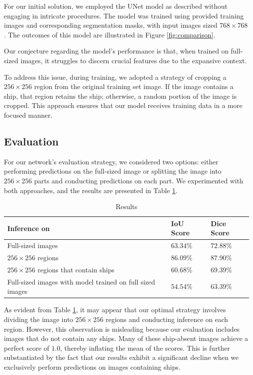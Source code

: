 \documentclass{article}
\begin{document}
For our initial solution, we employed the UNet model as described without engaging in intricate procedures.
The model was trained using provided training images and corresponding segmentation masks, with input
images sized \(768 \times 768\). The outcomes of this model are illustrated in Figure \ref{fig:comparison}.

Our conjecture regarding the model's performance is that, when trained on full-sized images, it struggles
to discern crucial features due to the expansive context.

To address this issue, during training, we adopted a strategy of cropping a \(256 \times 256\) region from
the original training set image. If the image contains a ship, that region retains the ship; otherwise, a random
portion of the image is cropped. This approach ensures that our model receives training data in a more focused manner.


\subsection{Evaluation}

For our network's evaluation strategy, we considered two options: either performing predictions on the full-sized image
or splitting the image into \(256 \times 256\) parts and conducting predictions on each part. We experimented with both
approaches, and the results are presented in Table \ref{results-table}.

\begin{table}
  \caption{Results}
  \label{results-table}
  \centering
  \begin{tabular}{lll}
    \toprule
    Inference on             & IoU Score & Dice Score \\[0.1cm]
    \midrule
    Full-sized images        & $63.34\%$ & $72.88\%$  \\[0.1cm]
    $256 \times 256$ regions & $86.09\%$ & $87.90\%$  \\[0.1cm]
    $256 \times 256$ regions 
      that contain ships     & $60.68\%$ & $69.39\%$  \\[0.1cm]
    Full-sized images with 
      model trained on full 
      sized images           & $54.54\%$ & $63.39\%$  \\[0.1cm]
    \bottomrule
  \end{tabular}
\end{table}

As evident from Table \ref{results-table}, it may appear that our optimal strategy involves dividing the image into
\(256 \times 256\) regions and conducting inference on each region. However, this observation is misleading because
our evaluation includes images that do not contain any ships. Many of these ship-absent images achieve a perfect score
of \(1.0\), thereby inflating the mean of the scores. This is further substantiated by the fact that our results exhibit
a significant decline when we exclusively perform predictions on images containing ships.
\end{document}
